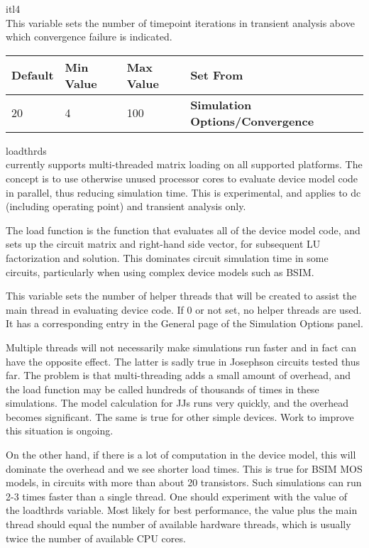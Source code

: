 \begin{description}
\item{\et itl4}\\
This variable sets the number of timepoint iterations in transient
analysis above which convergence failure is indicated.

\begin{tabular}{|l|l|l|l|}\hline
\bf Default & \bf Min Value & \bf Max Value & \bf Set From\\ \hline
20 & 4 & 100 & \bf Simulation Options/Convergence\\ \hline
\end{tabular}

\item{\et loadthrds}\\
{\WRspice} currently supports multi-threaded matrix loading on all
supported platforms.  The concept is to use otherwise unused processor
cores to evaluate device model code in parallel, thus reducing
simulation time.  This is experimental, and applies to dc (including
operating point) and transient analysis only.

The load function is the function that evaluates all of the device
model code, and sets up the circuit matrix and right-hand side vector,
for subsequent LU factorization and solution.  This dominates circuit
simulation time in some circuits, particularly when using complex
device models such as BSIM.

This variable sets the number of helper threads that will be created
to assist the main thread in evaluating device code.  If 0 or not set,
no helper threads are used.  It has a corresponding entry in the
{\cb General} page of the {\cb Simulation Options} panel.

Multiple threads will not necessarily make simulations run faster and
in fact can have the opposite effect.  The latter is sadly true in
Josephson circuits tested thus far.  The problem is that
multi-threading adds a small amount of overhead, and the load function
may be called hundreds of thousands of times in these simulations. 
The model calculation for JJs runs very quickly, and the overhead
becomes significant.  The same is true for other simple devices.  Work
to improve this situation is ongoing.

On the other hand, if there is a lot of computation in the device
model, this will dominate the overhead and we see shorter load times. 
This is true for BSIM MOS models, in circuits with more than about 20
transistors.  Such simulations can run 2-3 times faster than a single
thread.  One should experiment with the value of the {\et loadthrds}
variable.  Most likely for best performance, the value plus the main
thread should equal the number of available hardware threads, which is
usually twice the number of available CPU cores.


\end{description}
